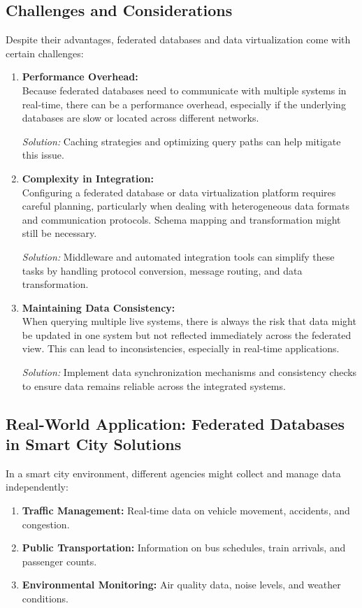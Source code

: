\documentclass[12pt]{article}
\begin{document}
\subsection{Challenges and Considerations}
Despite their advantages, federated databases and data virtualization come with certain challenges:
\begin{enumerate}
    \item \textbf{Performance Overhead:} \\
    Because federated databases need to communicate with multiple systems in real-time, there can be a performance overhead, especially if the underlying databases are slow or located across different networks. 
    
    \textit{Solution:} Caching strategies and optimizing query paths can help mitigate this issue.

    \item \textbf{Complexity in Integration:} \\
    Configuring a federated database or data virtualization platform requires careful planning, particularly when dealing with heterogeneous data formats and communication protocols. Schema mapping and transformation might still be necessary.
    
    \textit{Solution:} Middleware and automated integration tools can simplify these tasks by handling protocol conversion, message routing, and data transformation.

    \item \textbf{Maintaining Data Consistency:} \\
    When querying multiple live systems, there is always the risk that data might be updated in one system but not reflected immediately across the federated view. This can lead to inconsistencies, especially in real-time applications.
    
    \textit{Solution:} Implement data synchronization mechanisms and consistency checks to ensure data remains reliable across the integrated systems.
\end{enumerate}

\subsection{Real-World Application: Federated Databases in Smart City Solutions}
In a smart city environment, different agencies might collect and manage data independently:
\begin{enumerate}
    \item \textbf{Traffic Management:} Real-time data on vehicle movement, accidents, and congestion.
    \item \textbf{Public Transportation:} Information on bus schedules, train arrivals, and passenger counts.
    \item \textbf{Environmental Monitoring:} Air quality data, noise levels, and weather conditions.
\end{enumerate}
\end{document}
